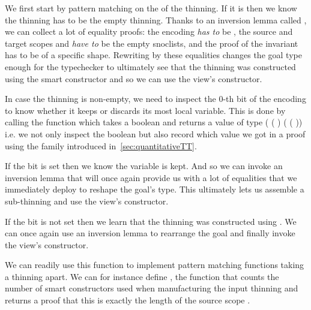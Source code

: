 We first start by pattern matching on the  of the thinning.
If it is  then we know the thinning has to be the empty thinning.
%
Thanks to an inversion lemma called , we can collect a lot
of equality proofs:
the encoding  \emph{has to} be ,
the source and target scopes  and  \emph{have to}
be the empty snoclists,
and the proof  of the invariant has to be of a specific shape.
%
Rewriting by these equalities changes the goal type enough
for the typechecker to ultimately see
that the thinning was constructed using the  smart
constructor and so we can use the view's  constructor.


In case the thinning is non-empty, we need to inspect the 0-th bit of the encoding
to know whether it keeps or discards its most local variable.
%
This is done by calling the  function which takes a boolean
 and returns a value of type
{( ( ) ( ( ))}
i.e. we not only inspect the boolean but also record which value we got in a proof
using the  family introduced in~\cref{sec:quantitativeTT}.


If the bit is set then we know the variable is kept.
%
And so we can invoke an inversion lemma that will once again provide us with
a lot of equalities that we immediately deploy to reshape the goal's type.
%
This ultimately lets us assemble a sub-thinning and use the view's
 constructor.


If the bit is not set then we learn that the thinning was constructed using
. We can once again use an inversion lemma to rearrange
the goal and finally invoke the view's  constructor.


We can readily use this function to implement pattern matching functions taking
a thinning apart. We can for instance define , the function
that counts the number of  smart constructors used when
manufacturing the input thinning and returns a proof that this is exactly the
length of the source scope .

